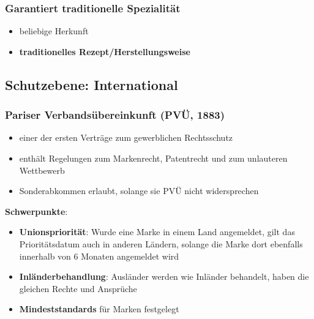 \documentclass[12pt,A4]{extarticle}
\newcommand{\highlight}[1]{\textcolor{highlightColor}{\textbf{#1}}}
\begin{document}
\subsubsection{Garantiert traditionelle Spezialität}
\begin{itemize}
  \item{beliebige Herkunft}
  \item{\textbf{traditionelles Rezept/Herstellungsweise}}
\end{itemize}

\subsection{Schutzebene: International}
\subsubsection{Pariser Verbandsübereinkunft (PVÜ, 1883)}\label{sec:PariserUebereinkunft}
\begin{itemize}
  \item{einer der ersten Verträge zum gewerblichen Rechtsschutz}
  \item{enthält Regelungen zum Markenrecht, Patentrecht und zum unlauteren Wettbewerb}
  \item{Sonderabkommen erlaubt, solange sie PVÜ nicht widersprechen}
\end{itemize}
\textbf{Schwerpunkte}:
\begin{itemize}
  \item{\highlight{Unionspriorität}: Wurde eine Marke in einem Land angemeldet, gilt das Prioritätsdatum auch in anderen Ländern, solange die Marke dort ebenfalls innerhalb von 6 Monaten angemeldet wird}
  \item{\highlight{Inländerbehandlung}: Ausländer werden wie Inländer behandelt, haben die gleichen Rechte und Ansprüche}
  \item{\textbf{Mindeststandards} für Marken festgelegt}
\end{itemize}
\end{document}
